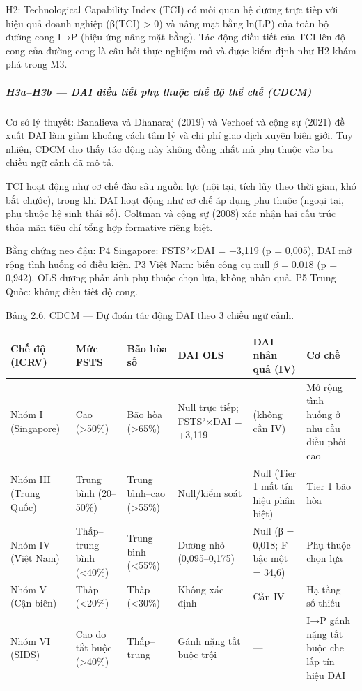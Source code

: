 \documentclass[12pt,a4paper]{article}
\begin{document}
H2: Technological Capability Index (TCI) có mối quan hệ dương trực tiếp
với hiệu quả doanh nghiệp (β(TCI) \textgreater{} 0) và nâng mặt bằng
ln(LP) của toàn bộ đường cong I→P (hiệu ứng nâng mặt bằng). Tác động
điều tiết của TCI lên độ cong của đường cong là câu hỏi thực nghiệm mở
và được kiểm định như H2 khám phá trong M3.

\hypertarget{h3ah3b--dai-ux111iux1ec1u-tiux1ebft-phux1ee5-thuux1ed9c-chux1ebf-ux111ux1ed9-thux1ec3-chux1ebf-cdcm}{%
\subparagraph{H3a--H3b --- DAI điều tiết phụ thuộc chế độ thể chế
(CDCM)}\label{h3ah3b--dai-ux111iux1ec1u-tiux1ebft-phux1ee5-thuux1ed9c-chux1ebf-ux111ux1ed9-thux1ec3-chux1ebf-cdcm}}

Cơ sở lý thuyết: Banalieva và Dhanaraj (2019) và Verhoef và cộng sự
(2021) đề xuất DAI làm giảm khoảng cách tâm lý và chi phí giao dịch
xuyên biên giới. Tuy nhiên, CDCM cho thấy tác động này không đồng nhất
mà phụ thuộc vào ba chiều ngữ cảnh đã mô tả.

TCI hoạt động như cơ chế đào sâu nguồn lực (nội tại, tích lũy theo thời
gian, khó bắt chước), trong khi DAI hoạt động như cơ chế áp dụng phụ
thuộc (ngoại tại, phụ thuộc hệ sinh thái số). Coltman và cộng sự (2008)
xác nhận hai cấu trúc thỏa mãn tiêu chí tổng hợp formative riêng biệt.

Bằng chứng neo đậu: P4 Singapore: FSTS²×DAI = +3,119 (p = 0,005), DAI mở
rộng tình huống có điều kiện. P3 Việt Nam: biến công cụ null
\(\beta = 0.018\) (p = 0,942), OLS dương phản ánh phụ thuộc chọn lựa,
không nhân quả. P5 Trung Quốc: không điều tiết độ cong.

Bảng 2.6. CDCM --- Dự đoán tác động DAI theo 3 chiều ngữ cảnh.

\begin{longtable}[]{@{}llllll@{}}
\toprule\noalign{}
Chế độ (ICRV) & Mức FSTS & Bão hòa số & DAI OLS & DAI nhân quả (IV) & Cơ
chế \\
\midrule\noalign{}
\endhead
\bottomrule\noalign{}
\endlastfoot
Nhóm I (Singapore) & Cao (\textgreater50\%) & Bão hòa (\textgreater65\%)
& Null trực tiếp; FSTS²×DAI = +3,119 & (không cần IV) & Mở rộng tình
huống ở nhu cầu điều phối cao \\
Nhóm III (Trung Quốc) & Trung bình (20--50\%) & Trung bình--cao
(\textgreater55\%) & Null/kiểm soát & Null (Tier 1 mất tín hiệu phân
biệt) & Tier 1 bão hòa \\
Nhóm IV (Việt Nam) & Thấp--trung bình (\textless40\%) & Trung bình
(\textless55\%) & Dương nhỏ (0,095--0,175) & Null (β = 0,018; F bậc một
= 34,6) & Phụ thuộc chọn lựa \\
Nhóm V (Cận biên) & Thấp (\textless20\%) & Thấp (\textless30\%) & Không
xác định & Cần IV & Hạ tầng số thiếu \\
Nhóm VI (SIDS) & Cao do tắt buộc (\textgreater40\%) & Thấp--trung & Gánh
nặng tắt buộc trội & --- & I→P gánh nặng tắt buộc che lấp tín hiệu
DAI \\
\end{longtable}
\end{document}
